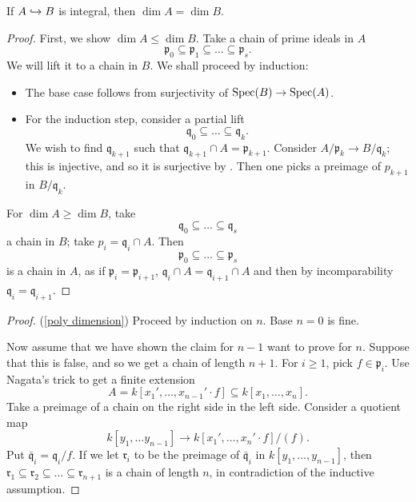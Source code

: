 \begin{prop}
  \label{going-up}
  If $A \hookrightarrow B$ is integral, then $\dim A = \dim B$.
\end{prop}
\begin{proof}
  First, we show $\dim A \leq \dim B$.
  Take a chain of prime ideals in $A$
  \[ \mathfrak p_0 \subseteq \mathfrak p_1 \subseteq \dotso \subseteq \mathfrak p_s.\]
  We will lift it to a chain in $B$. We shall proceed by induction:
  \begin{itemize}
  \item The base case follows from surjectivity of $\text{Spec}(B) \to \text{Spec}(A)$.
  \item For the induction step, consider a partial lift
    \[ \mathfrak q_0 \subseteq \dotso \subseteq \mathfrak q_k.\]
    We wish to find $\mathfrak q_{k+1}$ such that $\mathfrak q_{k+1} \cap A = \mathfrak p_{k+1}$.
    Consider $A/{\mathfrak p_k} \to B/{\mathfrak q_k}$; this is injective, and so it is surjective by
    .
    Then one picks a preimage of $p_{k+1}$ in $B/{\mathfrak q_k}$.
  \end{itemize}
  For $\dim A \geq \dim B$, take
  \[ \mathfrak q_0 \subseteq \dotso \subseteq \mathfrak q_s\]
  a chain in $B$; take $p_i = \mathfrak q_i \cap A$. Then
  \[ \mathfrak p_0 \subseteq \dotso \subseteq \mathfrak p_s\]
  is a chain in $A$, as if $\mathfrak p_i = \mathfrak p_{i+1}$, $\mathfrak q_i \cap A = \mathfrak q_{i+1} \cap A$ and then by incomparability
  $\mathfrak q_i = \mathfrak q_{i+1}$.
\end{proof}

\begin{proof}(\cref{poly dimension})
  Proceed by induction on $n$. Base $n=0$ is fine.

  Now assume that we have shown the claim for $n-1$ want to prove for $n$. Suppose that this is false, and so we get a chain of length $n+1$. For $i \geq 1$, pick $f \in \mathfrak p_i$.
  Use Nagata's trick to get a finite extension
  \[ A = k[x_1', \dotsc, x_{n-1}' \cdot f] \subseteq k[x_1, \dotsc, x_n].\]
  Take a preimage of a chain on the right side in the left side.
  Consider a quotient map
  \[ k[y_1, \dotsc y_{n-1}] \to k[x_1', \dotsc, x_n' \cdot f]/{(f)}.\]
  Put $\bar{\mathfrak q}_i = \mathfrak q_i /{f}$.
  If we let $\mathfrak r_i$ to be the preimage of $\bar{\mathfrak q}_i$ in $k[y_1, \dotsc, y_{n-1}]$, then
  \( \mathfrak r_1 \subseteq \mathfrak r_2 \subseteq \dotso \subseteq \mathfrak r_{n+1}\)
  is a chain of length $n$, in contradiction of the inductive assumption.
\end{proof}

